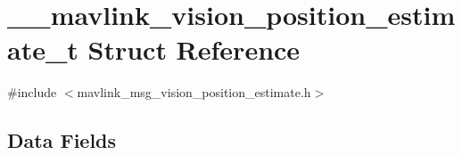 \hypertarget{struct____mavlink__vision__position__estimate__t}{\section{\-\_\-\-\_\-mavlink\-\_\-vision\-\_\-position\-\_\-estimate\-\_\-t Struct Reference}
\label{struct____mavlink__vision__position__estimate__t}
}


{\ttfamily \#include $<$mavlink\-\_\-msg\-\_\-vision\-\_\-position\-\_\-estimate.\-h$>$}

\subsection*{Data Fields}
